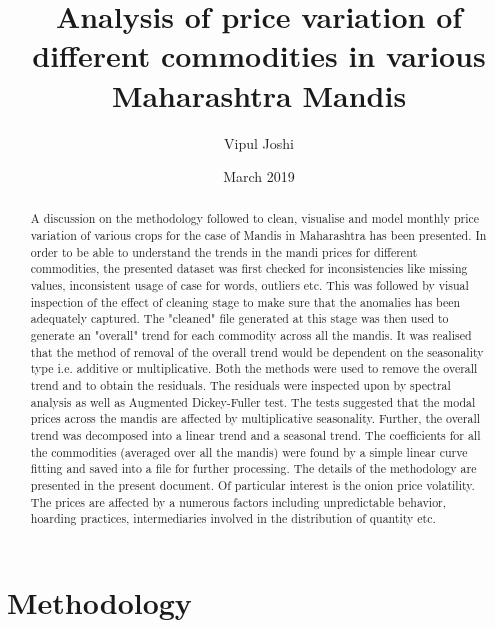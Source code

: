 \documentclass{article}
\title{Analysis of price variation of different commodities in various Maharashtra Mandis}
\author{Vipul Joshi }
\date{March 2019}
\begin{document}
   


\maketitle
 \begin{abstract}
        A discussion on the methodology followed to clean, visualise and model monthly price variation of various crops for the case of Mandis in Maharashtra has been presented. In order to be able to understand the trends in the mandi prices for different commodities, the presented dataset was first checked for inconsistencies like missing values, inconsistent usage of case for words, outliers etc. This was followed by visual inspection of the effect of cleaning stage to make sure that the anomalies has been adequately captured. The "cleaned" file generated at this stage was then used to generate an "overall" trend for each commodity across all the mandis. It was realised that the method of removal of the overall trend would be dependent on the seasonality type i.e. additive or multiplicative. Both the methods were used to remove the overall trend and to obtain the residuals. The residuals were inspected upon by spectral analysis as well as Augmented Dickey-Fuller test. The tests suggested that the modal prices across the mandis are affected by multiplicative seasonality. Further, the overall trend was decomposed into a linear trend and a seasonal trend. The coefficients for all the commodities (averaged over all the mandis) were found by a simple linear curve fitting and saved into a file for further processing. The details of the methodology are presented in the present document. Of particular interest is the onion price volatility. The prices are affected by a numerous factors including unpredictable behavior, hoarding practices, intermediaries involved in the distribution of quantity etc. 
    \end{abstract}
\section{Methodology}
\end{document}
